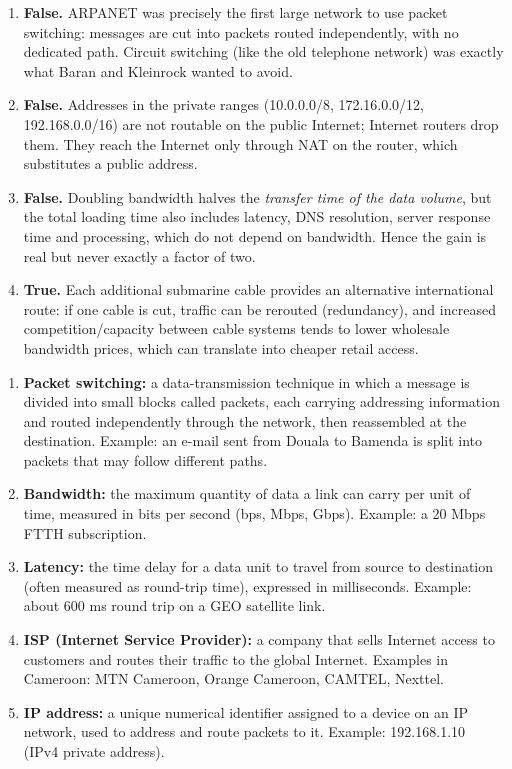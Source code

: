 \documentclass[11pt]{article}
\newcommand{\cle}[1]{{\popxbold\color{popdark}#1}}
\begin{document}
\begin{corrige}
\begin{enumerate}
\item \textbf{False.} ARPANET was precisely the first large network to use \cle{packet switching}: messages are cut into packets routed independently, with no dedicated path. Circuit switching (like the old telephone network) was exactly what Baran and Kleinrock wanted to avoid.
\item \textbf{False.} Addresses in the private ranges (10.0.0.0/8, 172.16.0.0/12, 192.168.0.0/16) are not routable on the public Internet; Internet routers drop them. They reach the Internet only through NAT on the router, which substitutes a public address.
\item \textbf{False.} Doubling bandwidth halves the \emph{transfer time of the data volume}, but the total loading time also includes latency, DNS resolution, server response time and processing, which do not depend on bandwidth. Hence the gain is real but never exactly a factor of two.
\item \textbf{True.} Each additional submarine cable provides an alternative international route: if one cable is cut, traffic can be rerouted (redundancy), and increased competition/capacity between cable systems tends to lower wholesale bandwidth prices, which can translate into cheaper retail access.
\end{enumerate}
\end{corrige}

\begin{corrige}
\begin{enumerate}
\item \textbf{Packet switching:} a data-transmission technique in which a message is divided into small blocks called \cle{packets}, each carrying addressing information and routed independently through the network, then reassembled at the destination. Example: an e-mail sent from Douala to Bamenda is split into packets that may follow different paths.
\item \textbf{Bandwidth:} the maximum quantity of data a link can carry per unit of time, measured in bits per second (bps, Mbps, Gbps). Example: a 20 Mbps FTTH subscription.
\item \textbf{Latency:} the time delay for a data unit to travel from source to destination (often measured as round-trip time), expressed in milliseconds. Example: about 600 ms round trip on a GEO satellite link.
\item \textbf{ISP (Internet Service Provider):} a company that sells Internet access to customers and routes their traffic to the global Internet. Examples in Cameroon: MTN Cameroon, Orange Cameroon, CAMTEL, Nexttel.
\item \textbf{IP address:} a unique numerical identifier assigned to a device on an IP network, used to address and route packets to it. Example: 192.168.1.10 (IPv4 private address).
\end{enumerate}
\end{corrige}
\end{document}
